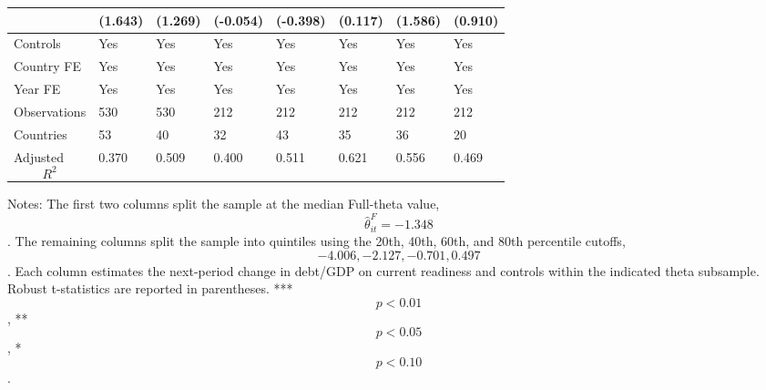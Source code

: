 \begin{table}[H]
\begin{threeparttable}
\begin{tabularx}{\textwidth}{lYYYYYYY}
  & (1.643) & (1.269) & (-0.054) & (-0.398) & (0.117) & (1.586) & (0.910) \\
\midrule
Controls & Yes & Yes & Yes & Yes & Yes & Yes & Yes \\
Country FE & Yes & Yes & Yes & Yes & Yes & Yes & Yes \\
Year FE & Yes & Yes & Yes & Yes & Yes & Yes & Yes \\
Observations & 530 & 530 & 212 & 212 & 212 & 212 & 212 \\
Countries & 53 & 40 & 32 & 43 & 35 & 36 & 20 \\
Adjusted $$R^2$$ & 0.370 & 0.509 & 0.400 & 0.511 & 0.621 & 0.556 & 0.469 \\
\bottomrule
\end{tabularx}
\begin{tablenotes}[flushleft]\footnotesize
\item Notes: The first two columns split the sample at the median Full-theta value, $$\widehat{\theta}^{F}_{it}=-1.348$$. The remaining columns split the sample into quintiles using the 20th, 40th, 60th, and 80th percentile cutoffs, $$-4.006, -2.127, -0.701, 0.497$$. Each column estimates the next-period change in debt/GDP on current readiness and controls within the indicated theta subsample. Robust t-statistics are reported in parentheses. *** $$p<0.01$$, ** $$p<0.05$$, * $$p<0.10$$.
\end{tablenotes}
\end{threeparttable}
\end{table}
